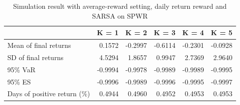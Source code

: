 \documentclass{article}
\begin{document}
\begin{table}[H]
\centering
\begin{tabular}{|l|r|r|r|r|r|} 
\hline
                             & \multicolumn{1}{l|}{K = 1} & \multicolumn{1}{l|}{K = 2} & \multicolumn{1}{l|}{K = 3} & \multicolumn{1}{l|}{K = 4} & \multicolumn{1}{l|}{K = 5}  \\ 
\hline
Mean of final returns        & 0.1572                     & -0.2997                    & -0.6114                    & -0.2301                    & -0.0928                     \\ 
\hline
SD of final returns          & 4.5294                     & 1.8657                     & 0.9947                     & 2.7369                     & 2.9640                      \\ 
\hline
95\% VaR                     & -0.9994                    & -0.9978                    & -0.9989                    & -0.9989                    & -0.9995                     \\ 
\hline
95\% ES                      & -0.9996                    & -0.9989                    & -0.9996                    & -0.9995                    & -0.9997                     \\ 
\hline
Days of positive return (\%) & 0.4944                     & 0.4960                     & 0.4952                     & 0.4953                     & 0.4953                      \\
\hline
\end{tabular}
\caption{Simulation result with average-reward setting, daily return reward and SARSA on SPWR}
\label{table11}
\end{table}
\end{document}

